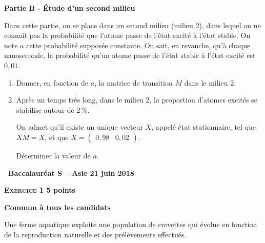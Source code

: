 \documentclass[10pt,a4paper]{article}
\begin{document}
\bigskip

\textbf{Partie B - Étude d'un second milieu}

\medskip

Dans cette partie, on se place dans un second milieu (milieu 2), dans lequel on ne connaît pas la probabilité que l'atome passe de l'état excité à l'état stable. On note $a$ cette probabilité supposée constante. On sait, en revanche, qu'à chaque nanoseconde, la probabilité qu'un atome passe de l'état stable à l'état excité est $0,01$.

\medskip

\begin{enumerate}
\item Donner, en fonction de $a$, la matrice de transition $M$ dans le milieu 2.
\item Après un temps très long, dans le milieu 2, la proportion d'atomes excités se stabilise autour de 2\,\%.

On admet qu'il existe un unique vecteur $X$, appelé état stationnaire, tel que $XM = X$, et que $X = \begin{pmatrix}0,98& 0,02\end{pmatrix}$.

Déterminer la valeur de $a$.
\end{enumerate}
\newpage
\hypertarget{Asie}{}

\label{Asie}
\pagestyle{fancy}
\thispagestyle{empty} 

\begin{center} {\Large{\textbf{\decofourleft~Baccalauréat S -- Asie 21 juin 2018~\decofourright}}}
\end{center}

\vspace{0,5cm}

\textbf{\textsc{\bf Exercice 1} \hfill 5 points}
 
\medskip
 
\textbf{Commun  à tous les candidats}

\bigskip

Une ferme aquatique exploite une population de crevettes qui évolue en fonction de la reproduction naturelle et des prélèvements effectués.
\end{document}
